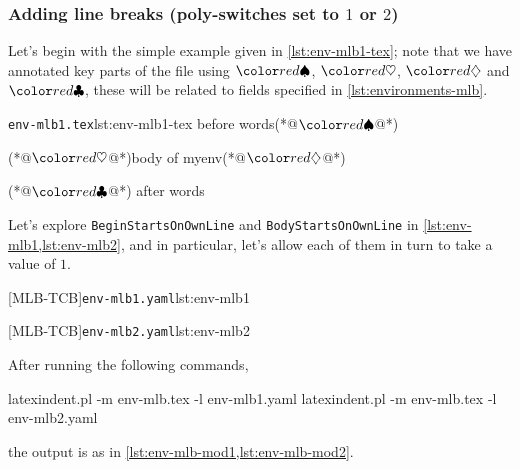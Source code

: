 \subsubsection{Adding line breaks (poly-switches set to $1$ or $2$)}
	Let's begin with the simple example given in \cref{lst:env-mlb1-tex}; note that we have annotated key parts of the file using $\BeginStartsOnOwnLine$,
	$\BodyStartsOnOwnLine$, $\EndStartsOnOwnLine$ and $\EndFinishesWithLineBreak$, these will be related to fields specified in \cref{lst:environments-mlb}.

	\begin{cmhlistings}[escapeinside={(*@}{@*)}]{\texttt{env-mlb1.tex}}{lst:env-mlb1-tex}
before words(*@$\BeginStartsOnOwnLine$@*) \begin{myenv}(*@$\BodyStartsOnOwnLine$@*)body of myenv(*@$\EndStartsOnOwnLine$@*)\end{myenv}(*@$\EndFinishesWithLineBreak$@*) after words
\end{cmhlistings}

	Let's explore \texttt{BeginStartsOnOwnLine} and \texttt{BodyStartsOnOwnLine} in \cref{lst:env-mlb1,lst:env-mlb2}, and in particular,
	let's allow each of them in turn to take a value of $1$.

	\begin{minipage}{.45\textwidth}
		[MLB-TCB]{\texttt{env-mlb1.yaml}}{lst:env-mlb1}
	\end{minipage}
	\hfill
	\begin{minipage}{.45\textwidth}
		[MLB-TCB]{\texttt{env-mlb2.yaml}}{lst:env-mlb2}
	\end{minipage}

	After running the following commands,
	\begin{commandshell}
latexindent.pl -m env-mlb.tex -l env-mlb1.yaml
latexindent.pl -m env-mlb.tex -l env-mlb2.yaml
\end{commandshell}
	the output is as in \cref{lst:env-mlb-mod1,lst:env-mlb-mod2}.

	\begin{sidebyside}
		\begin{minipage}{.57\linewidth}
		\end{minipage}
		\hfill
		\begin{minipage}{.42\linewidth}
		\end{minipage}
	\end{sidebyside}

